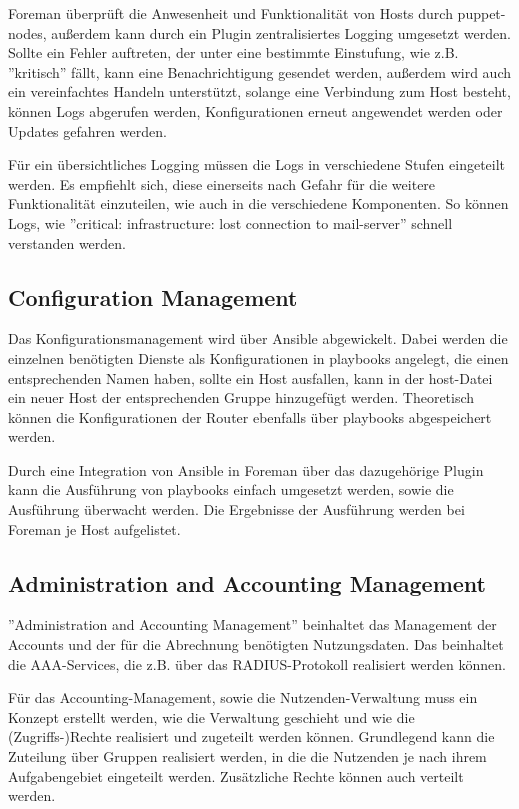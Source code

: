 Foreman überprüft die Anwesenheit und Funktionalität von Hosts durch puppet-nodes, außerdem kann durch ein Plugin zentralisiertes Logging umgesetzt werden. Sollte ein Fehler auftreten, der unter eine bestimmte Einstufung, wie z.B. ''kritisch'' fällt, kann eine Benachrichtigung gesendet werden, außerdem wird auch ein vereinfachtes Handeln unterstützt, solange eine Verbindung zum Host besteht, können Logs abgerufen werden, Konfigurationen erneut angewendet werden oder Updates gefahren werden.

Für ein übersichtliches Logging müssen die Logs in verschiedene Stufen eingeteilt werden. Es empfiehlt sich, diese einerseits nach Gefahr für die weitere Funktionalität einzuteilen, wie auch in die verschiedene Komponenten. So können Logs, wie ''critical: infrastructure: lost connection to mail-server'' schnell verstanden werden.

\subsection{Configuration Management}
Das Konfigurationsmanagement wird über Ansible abgewickelt. Dabei werden die einzelnen benötigten Dienste als Konfigurationen in playbooks angelegt, die einen entsprechenden Namen haben, sollte ein Host ausfallen, kann in der host-Datei ein neuer Host der entsprechenden Gruppe hinzugefügt werden. Theoretisch können die Konfigurationen der Router ebenfalls über playbooks abgespeichert werden. 

Durch eine Integration von Ansible in Foreman über das dazugehörige Plugin kann die Ausführung von playbooks einfach umgesetzt werden, sowie die Ausführung überwacht werden. Die Ergebnisse der Ausführung werden bei Foreman je Host aufgelistet.

\subsection{Administration and Accounting Management}
''Administration and Accounting Management'' beinhaltet das Management der Accounts und der für die Abrechnung benötigten Nutzungsdaten. Das beinhaltet die AAA-Services, die z.B. über das RADIUS-Protokoll realisiert werden können. 

Für das Accounting-Management, sowie die Nutzenden-Verwaltung muss ein Konzept erstellt werden, wie die Verwaltung geschieht und wie die (Zugriffs-)Rechte realisiert und zugeteilt werden können. Grundlegend kann die Zuteilung über Gruppen realisiert werden, in die die Nutzenden je nach ihrem Aufgabengebiet eingeteilt werden. Zusätzliche Rechte können auch verteilt werden.

